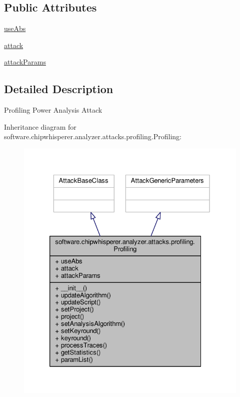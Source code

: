 \subsection*{Public Attributes}
\begin{DoxyCompactItemize}
\item 
\hyperlink{classsoftware_1_1chipwhisperer_1_1analyzer_1_1attacks_1_1profiling_1_1Profiling_a349d6c4d9e8d3044028da974bb747faf}{use\+Abs}
\item 
\hyperlink{classsoftware_1_1chipwhisperer_1_1analyzer_1_1attacks_1_1profiling_1_1Profiling_af329fa2066c563ce7b0af5c080b207a1}{attack}
\item 
\hyperlink{classsoftware_1_1chipwhisperer_1_1analyzer_1_1attacks_1_1profiling_1_1Profiling_ae20255f592a44b7a184d1859c584337f}{attack\+Params}
\end{DoxyCompactItemize}


\subsection{Detailed Description}
\begin{DoxyVerb}Profiling Power Analysis Attack\end{DoxyVerb}
 

Inheritance diagram for software.\+chipwhisperer.\+analyzer.\+attacks.\+profiling.\+Profiling\+:\nopagebreak
\begin{figure}[H]
\begin{center}
\leavevmode
\includegraphics[width=326pt]{d1/d73/classsoftware_1_1chipwhisperer_1_1analyzer_1_1attacks_1_1profiling_1_1Profiling__inherit__graph}
\end{center}
\end{figure}


